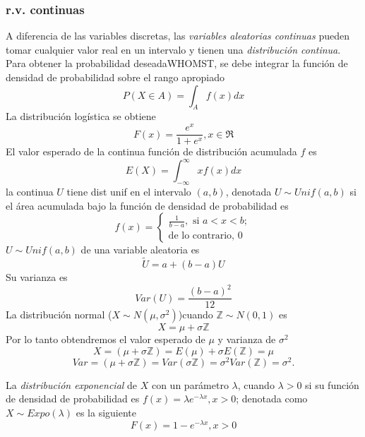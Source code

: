 \subsubsection{r.v. continuas}
A diferencia de las variables discretas, las \emph{variables aleatorias continuas} pueden tomar cualquier valor real en un intervalo y tienen una \emph{distribución continua}. Para obtener la probabilidad deseadaWHOMST, se debe integrar la función de densidad de probabilidad sobre el rango apropiado
\begin{equation}
P(X\in A)=\int_{A}f(x)dx
\end{equation}
La distribución logística se obtiene
\begin{equation}
F(x)=\frac{e^x}{1+e^x}, x\in\Re
\end{equation}
El valor esperado de la continua función de distribución acumulada $f$ es
\begin{equation}
E(X)=\int_{-\infty}^{\infty}xf(x)dx
\end{equation}
la continua $U$ tiene dist unif en el intervalo $(a,b)$, denotada $U \sim Unif(a,b)$ si el área acumulada bajo la función de densidad de probabilidad es
\begin{equation}
f(x)=\begin{cases}
\frac{1}{b-a},\text{ si }a<x<b;\\
\text{de lo contrario, }0
\end{cases}
\end{equation}
$U \sim Unif(a,b)$ de una variable aleatoria es
\begin{equation}
\tilde{U}=a+(b-a)U
\end{equation}
Su varianza es
\begin{equation}
Var(U)=\frac{{(b-a)}^2}{12}
\end{equation}
La distribución normal ($X \sim N(\mu,\sigma^2)$)cuando $\mathbb{Z} \sim N(0,1)$ es
\begin{equation}
X=\mu+\sigma\mathbb{Z}
\end{equation}
Por lo tanto obtendremos el valor esperado de $\mu$ y varianza de $\sigma^2$
\begin{equation}
X=(\mu+\sigma\mathbb{Z})=E(\mu)+\sigma E(\mathbb{Z})=\mu
\end{equation}
\begin{equation}
Var=(\mu+\sigma\mathbb{Z})=Var(\sigma\mathbb{Z})=\sigma^2Var(\mathbb{Z})=\sigma^2.
\end{equation}

La \emph{distribución exponencial} de $X$ con un parámetro $\lambda$, cuando $\lambda>0$ si su función de densidad de probabilidad es $f(x)=\lambda e^{-\lambda x} , x>0$; denotada como $X \sim Expo(\lambda)$ es la siguiente
\begin{equation}
F(x)=1-e^{-\lambda x}, x>0
\end{equation}